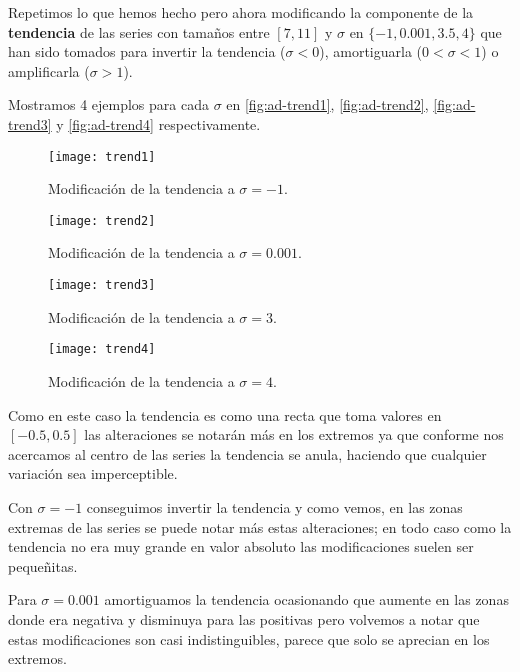 Repetimos lo que hemos hecho pero ahora modificando la componente de la \textbf{tendencia} de las series con tamaños entre $[7, 11]$ y $\sigma$ en $\{-1, 0.001, 3.5, 4\}$ que han sido tomados para invertir la tendencia ($\sigma < 0$), amortiguarla ($0 < \sigma < 1$) o amplificarla ($\sigma > 1$).

Mostramos 4 ejemplos para cada $\sigma$ en \autoref{fig:ad-trend1}, \autoref{fig:ad-trend2}, \autoref{fig:ad-trend3} y \autoref{fig:ad-trend4} respectivamente.

\begin{figure}[htpb]
  \centering
  \texttt{[image: trend1]}
  \caption{Modificación de la tendencia a $\sigma = -1$.}
  \label{fig:ad-trend1}
\end{figure}

\begin{figure}[htpb]
  \centering
  \texttt{[image: trend2]}
  \caption{Modificación de la tendencia a $\sigma = 0.001$.}
  \label{fig:ad-trend2}
\end{figure}


\begin{figure}[htpb]
  \centering
  \texttt{[image: trend3]}
  \caption{Modificación de la tendencia a $\sigma = 3$.}
  \label{fig:ad-trend3}
\end{figure}


\begin{figure}[htpb]
  \centering
  \texttt{[image: trend4]}
  \caption{Modificación de la tendencia a $\sigma = 4$.}
  \label{fig:ad-trend4}
\end{figure}

Como en este caso la tendencia es como una recta que toma valores en $[-0.5, 0.5]$ las alteraciones se notarán más en los extremos ya que conforme nos acercamos al centro de las series la tendencia se anula, haciendo que cualquier variación sea imperceptible.

Con $\sigma = -1$ conseguimos invertir la tendencia y como vemos, en las zonas extremas de las series se puede notar más estas alteraciones; en todo caso como la tendencia no era muy grande en valor absoluto las modificaciones suelen ser pequeñitas.

Para $\sigma = 0.001$ amortiguamos la tendencia ocasionando que aumente en las zonas donde era negativa y disminuya para las positivas pero volvemos a notar que estas modificaciones son casi indistinguibles, parece que solo se aprecian en los extremos.

